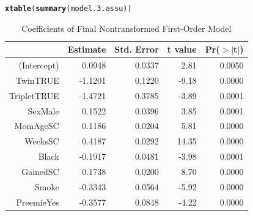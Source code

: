 \documentclass{article}\usepackage[]{graphicx}\usepackage[]{xcolor}
\makeatletter
\newcommand{\hlstd}[1]{\textcolor[rgb]{0.345,0.345,0.345}{#1}}%
\newcommand{\hlkwd}[1]{\textcolor[rgb]{0.737,0.353,0.396}{\textbf{#1}}}%
\newenvironment{kframe}{%
 \def\at@end@of@kframe{}%
 \ifinner\ifhmode%
  \def\at@end@of@kframe{\end{minipage}}%
  \begin{minipage}{\columnwidth}%
 \fi\fi%
 \def\FrameCommand##1{\hskip\@totalleftmargin \hskip-\fboxsep
 \colorbox{shadecolor}{##1}\hskip-\fboxsep
     \hskip-\linewidth \hskip-\@totalleftmargin \hskip\columnwidth}%
 \MakeFramed {\advance\hsize-\width
   \@totalleftmargin\z@ \linewidth\hsize
   \@setminipage}}%
 {\par\unskip\endMakeFramed%
 \at@end@of@kframe}
\newenvironment{knitrout}{}{} %
\makeatother
\begin{document}
\begin{enumerate}[a.]
\begin{knitrout}
\color{fgcolor}\begin{kframe}
\begin{alltt}
\hlkwd{xtable}\hlstd{(}\hlkwd{summary}\hlstd{(model.3.assu))}
\end{alltt}
\end{kframe}
\end{knitrout}
\begin{table}[H]
\centering
\begin{tabular}{rrrrr}
  \hline
 & Estimate & Std. Error & t value & Pr($>$$|$t$|$) \\ 
  \hline
(Intercept) & 0.0948 & 0.0337 & 2.81 & 0.0050 \\ 
  TwinTRUE & -1.1201 & 0.1220 & -9.18 & 0.0000 \\ 
  TripletTRUE & -1.4721 & 0.3785 & -3.89 & 0.0001 \\ 
  SexMale & 0.1522 & 0.0396 & 3.85 & 0.0001 \\ 
  MomAgeSC & 0.1186 & 0.0204 & 5.81 & 0.0000 \\ 
  WeeksSC & 0.4187 & 0.0292 & 14.35 & 0.0000 \\ 
  Black & -0.1917 & 0.0481 & -3.98 & 0.0001 \\ 
  GainedSC & 0.1738 & 0.0200 & 8.70 & 0.0000 \\ 
  Smoke & -0.3343 & 0.0564 & -5.92 & 0.0000 \\ 
  PreemieYes & -0.3577 & 0.0848 & -4.22 & 0.0000 \\ 
   \hline
\end{tabular}
\caption{Coefficients of Final Nontransformed First-Order Model}
\label{coef.mod.assu}
\end{table}


\end{enumerate}
\end{document}
